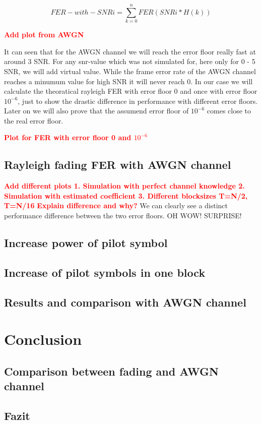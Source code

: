 \documentclass[12pt,oneside, reqno]{report}
\newcommand\boldred[1]{\textcolor{red}{\textbf{#1}}}
\begin{document}
\begin{equation}
\label{eq:theo}
FER-with-SNRi = \sum_{k = 0}^n FER(SNRi * H(k))
\end{equation}

\boldred{Add plot from AWGN}

It can seen that for the AWGN channel we will reach the error floor really fast at around 3 SNR. For any snr-value which was not simulated for, here only for 0 - 5 SNR, we will add virtual value. While the frame error rate of the AWGN channel reaches a minumum value for high SNR it will never reach 0. In our case we will calculate the theoratical rayleigh FER with error floor 0 and once with error floor $10^{-6}$, just to show the drastic difference in performance with different error floors. Later on we will also prove that the assumend error floor of 
$10^{-6}$ comes close to the real error floor. 

\boldred{Plot for FER with error floor 0 and $10^{-6}$}


\section{Rayleigh fading FER with AWGN channel}


\boldred{Add different plots 1. Simulation with perfect channel knowledge 2. Simulation with estimated coefficient 3. Different blocksizes T=N/2, T=N/16}
\boldred{Explain difference and why?}
We can clearly see a distinct performance difference between the two error floors. OH WOW! SURPRISE!

\section{Increase power of pilot symbol}

\section{Increase of pilot symbols in one block}


\section{Results and comparison with AWGN channel}


\chapter{Conclusion}

\section{Comparison between fading and AWGN channel}

\section{Fazit}




 
















%
\end{document}
